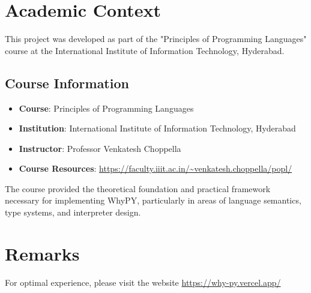 \documentclass[11pt]{article}
\newenvironment{feature}
{\begin{tcolorbox}[
    colback=lightgray,
    colframe=primary,
    arc=0mm,
    boxrule=1pt
]}
{\end{tcolorbox}}
\begin{document}
\section{Academic Context}
\begin{feature}
This project was developed as part of the "Principles of Programming Languages" course at the International Institute of Information Technology, Hyderabad.

\subsection*{Course Information}
\begin{itemize}[label=\textcolor{primary}{\faGraduationCap}]
    \item \textbf{Course}: Principles of Programming Languages
    \item \textbf{Institution}: International Institute of Information Technology, Hyderabad
    \item \textbf{Instructor}: Professor Venkatesh Choppella
    \item \textbf{Course Resources}: \url{https://faculty.iiit.ac.in/~venkatesh.choppella/popl/}
\end{itemize}

The course provided the theoretical foundation and practical framework necessary for implementing WhyPY, particularly in areas of language semantics, type systems, and interpreter design.
\end{feature}

\section*{Remarks}
\begin{feature}
For optimal experience, please visit the website \url{https://why-py.vercel.app/}
\end{feature}
\end{document}
